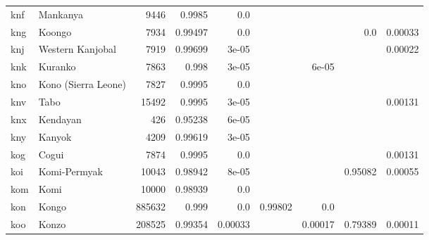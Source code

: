 \documentclass[11pt]{article}
\begin{document}
\begin{table*}[h]
{\begin{tabular}{llrrrrrrr}
knf         & Mankanya         & 9446         & 0.9985         & 0.0         &          &          &          &          \\

kng         & Koongo         & 7934         & 0.99497         & 0.0         &          &          & 0.0         & 0.00033         \\

knj         & Western Kanjobal         & 7919         & 0.99699         & 3e-05         &          &          &          & 0.00022         \\

knk         & Kuranko         & 7863         & 0.998         & 3e-05         &          & 6e-05         &          &          \\

kno         & Kono (Sierra Leone)         & 7827         & 0.9995         & 0.0         &          &          &          &          \\

knv         & Tabo         & 15492         & 0.9995         & 3e-05         &          &          &          & 0.00131         \\

knx         & Kendayan         & 426         & 0.95238         & 6e-05         &          &          &          &          \\

kny         & Kanyok         & 4209         & 0.99619         & 3e-05         &          &          &          &          \\

kog         & Cogui         & 7874         & 0.9995         & 0.0         &          &          &          & 0.00131         \\

koi         & Komi-Permyak         & 10043         & 0.98942         & 8e-05         &          &          & 0.95082         & 0.00055         \\

kom         & Komi         & 10000         & 0.98939         & 0.0         &          &          &          &          \\

kon         & Kongo         & 885632         & 0.999         & 0.0         & 0.99802         & 0.0         &          &          \\

koo         & Konzo         & 208525         & 0.99354         & 0.00033         &          & 0.00017         & 0.79389         & 0.00011         \\


\end{tabular}}
\end{table*}
\end{document}

